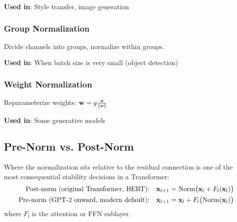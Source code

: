 \textbf{Used in}: Style transfer, image generation

\subsubsection{Group Normalization}

Divide channels into groups, normalize within groups.

\textbf{Used in}: When batch size is very small (object detection)

\subsubsection{Weight Normalization}

Reparameterize weights: $\mathbf{w} = g \frac{\bm{v}}{\|\bm{v}\|}$

\textbf{Used in}: Some generative models

\subsection{Pre-Norm vs. Post-Norm}
\label{subsec:prenorm_postnorm}

Where the normalization sits relative to the residual connection is one of the most consequential stability decisions in a Transformer:
\begin{align}
\text{Post-norm (original Transformer, BERT):}\quad \mathbf{x}_{l+1} &= \mathrm{Norm}\big(\mathbf{x}_l + F_l(\mathbf{x}_l)\big) \\
\text{Pre-norm (GPT-2 onward, modern default):}\quad \mathbf{x}_{l+1} &= \mathbf{x}_l + F_l\big(\mathrm{Norm}(\mathbf{x}_l)\big)
\end{align}
where $F_l$ is the attention or FFN sublayer.

